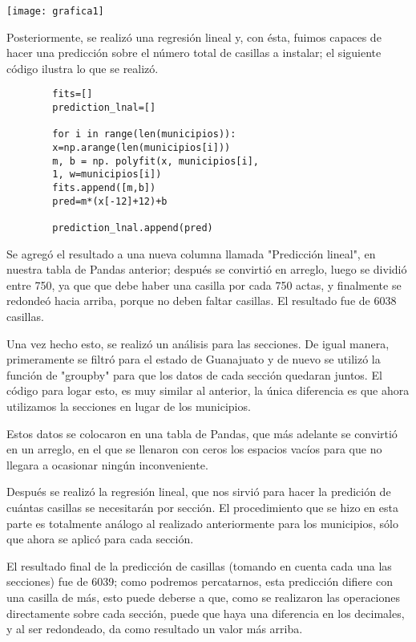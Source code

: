 \documentclass[11pt]{article}
\begin{document}
		\begin{center}
			\texttt{[image: grafica1]}\label{fig:1}
		\end{center}
		
\begin{multicols}{2}
	Posteriormente, se realizó una regresión lineal y, con ésta, fuimos capaces de hacer una predicción sobre el número total de casillas a instalar; el siguiente código ilustra lo que se realizó.
	\begin{verbatim}
		fits=[]
		prediction_lnal=[]
		
		for i in range(len(municipios)):
		x=np.arange(len(municipios[i]))
		m, b = np. polyfit(x, municipios[i],
		1, w=municipios[i])
		fits.append([m,b])
		pred=m*(x[-12]+12)+b
		
		prediction_lnal.append(pred)
	\end{verbatim}
	Se agregó el resultado a una nueva columna llamada "Predicción lineal", en nuestra tabla de Pandas anterior; después se convirtió en arreglo, luego se dividió entre 750, ya que que debe haber una casilla por cada 750 actas, y finalmente se redondeó hacia arriba, porque no deben faltar casillas.
	El resultado fue de 6038 casillas.\par
	Una vez hecho esto, se realizó un análisis para las secciones. De igual manera, primeramente se filtró para el estado de Guanajuato y de nuevo se utilizó la función de "groupby" para que los datos de cada sección quedaran juntos. El código para logar esto, es muy similar al anterior, la única diferencia es que ahora utilizamos la secciones en lugar de los municipios.\par
	Estos datos se colocaron en una tabla de Pandas, que más adelante se convirtió en un arreglo, en el que se llenaron con ceros los espacios vacíos para que no llegara a ocasionar ningún inconveniente.\par
	Después se realizó la regresión lineal, que nos sirvió para hacer la predición de cuántas casillas se necesitarán por sección. El procedimiento que se hizo en esta parte es totalmente análogo al realizado anteriormente para los municipios, sólo que ahora se aplicó para cada sección.\par 
	El resultado final de la predicción de casillas (tomando en cuenta cada una las secciones) fue de 6039; como podremos percatarnos, esta predicción difiere con una casilla de más, esto puede deberse a que, como se realizaron las operaciones directamente sobre cada sección, puede que haya una diferencia en los decimales, y al ser redondeado, da como resultado un valor más arriba.

\end{multicols}
\end{document}
